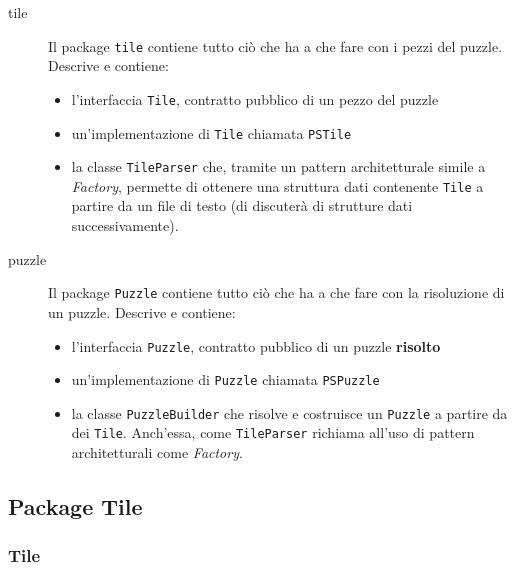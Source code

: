 \documentclass[a4paper, 12pt]{article}
\begin{document}
      \begin{description}

        \item[tile] Il package \verb|tile| contiene tutto ciò che ha a che fare con i pezzi del puzzle. Descrive e contiene:

        \begin{itemize}

          \item l'interfaccia \verb|Tile|, contratto pubblico di un pezzo del puzzle
          \item un'implementazione di \verb|Tile| chiamata \verb|PSTile|
          \item la classe \verb|TileParser| che, tramite un pattern architetturale simile a \emph{Factory}, permette di ottenere una struttura dati contenente \verb|Tile| a partire da un file di testo (di discuterà di strutture dati successivamente). 

        \end{itemize}

        \item[puzzle] Il package \verb|Puzzle| contiene tutto ciò che ha a che fare con la risoluzione di un puzzle. Descrive e contiene:

        \begin{itemize}

          \item l'interfaccia \verb|Puzzle|, contratto pubblico di un puzzle \textbf{risolto}
          \item un'implementazione di \verb|Puzzle| chiamata \verb|PSPuzzle|
          \item la classe \verb|PuzzleBuilder| che risolve e costruisce un \verb|Puzzle| a partire da dei \verb|Tile|. Anch'essa, come \verb|TileParser| richiama all'uso di pattern architetturali come \emph{Factory}.

        \end{itemize}

      \end{description}

    \subsection{Package Tile}

      \subsubsection{Tile}
\end{document}
